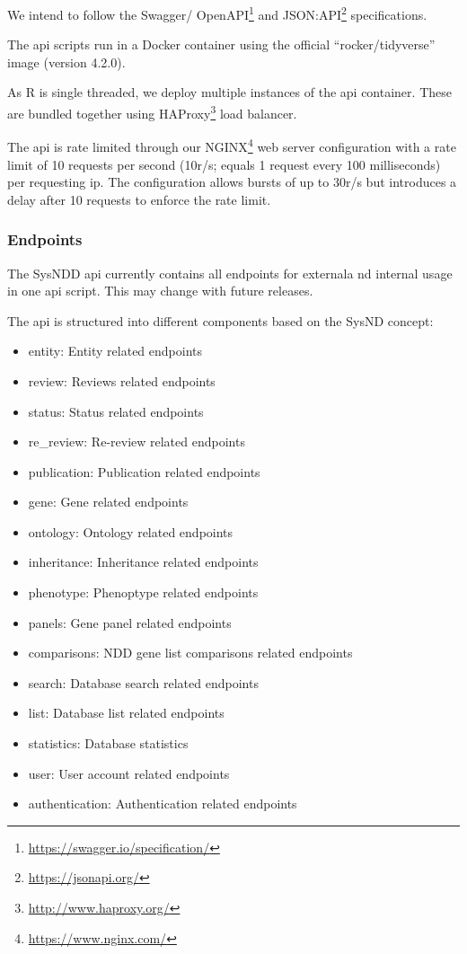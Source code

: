\documentclass[
]{article}
\providecommand{\tightlist}{%
  \setlength{\itemsep}{0pt}\setlength{\parskip}{0pt}}
\renewcommand{\href}[2]{#2\footnote{\url{#1}}}
\begin{document}
We intend to follow the \href{https://swagger.io/specification/}{Swagger/ OpenAPI} and \href{https://jsonapi.org/}{JSON:API} specifications.

The api scripts run in a Docker container using the official ``rocker/tidyverse'' image (version 4.2.0).

As R is single threaded, we deploy multiple instances of the api container. These are bundled together using \href{http://www.haproxy.org/}{HAProxy} load balancer.

The api is rate limited through our \href{https://www.nginx.com/}{NGINX} web server configuration with a rate limit of 10 requests per second (10r/s; equals 1 request every 100 milliseconds) per requesting ip. The configuration allows bursts of up to 30r/s but introduces a delay after 10 requests to enforce the rate limit.

\hypertarget{endpoints}{%
\subsubsection{Endpoints}\label{endpoints}}

The SysNDD api currently contains all endpoints for externala nd internal usage in one api script. This may change with future releases.

The api is structured into different components based on the SysND concept:

\begin{itemize}
\tightlist
\item
  entity: Entity related endpoints
\item
  review: Reviews related endpoints
\item
  status: Status related endpoints
\item
  re\_review: Re-review related endpoints
\item
  publication: Publication related endpoints
\item
  gene: Gene related endpoints
\item
  ontology: Ontology related endpoints
\item
  inheritance: Inheritance related endpoints
\item
  phenotype: Phenoptype related endpoints
\item
  panels: Gene panel related endpoints
\item
  comparisons: NDD gene list comparisons related endpoints
\item
  search: Database search related endpoints
\item
  list: Database list related endpoints
\item
  statistics: Database statistics
\item
  user: User account related endpoints
\item
  authentication: Authentication related endpoints
\end{itemize}
\end{document}
